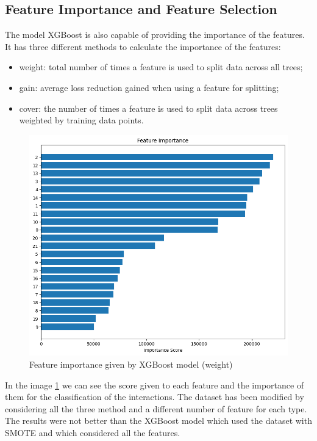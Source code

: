 \documentclass[10pt,twocolumn,letterpaper]{article}
\begin{document}
\subsection{Feature Importance and Feature Selection}
The model XGBoost is also capable of providing the importance of the features. It has three 
different methods to calculate the importance of the features: 
\begin{itemize}
    \item weight: total number of times a feature is used to split data across all trees;
    \item gain: average loss reduction gained when using a feature for splitting;
    \item cover: the number of times a feature is used to split data across trees weighted by training data points.
\end{itemize}
\begin{center}
    \begin{figure}[h!]
        \centering
        \includegraphics[scale=0.4]{img/fs.png}
        \caption{Feature importance given by XGBoost model (weight)}
        \label{fig:fs}
    \end{figure}
\end{center}
In the image \ref{fig:fs} we can see the score given to each feature and the importance of them 
for the classification of the interactions. The dataset has been modified by considering all the three method and a different number 
of feature for each type. The results were not better than the XGBoost model which used the dataset with SMOTE and which 
considered all the features.
\newpage
\end{document}
